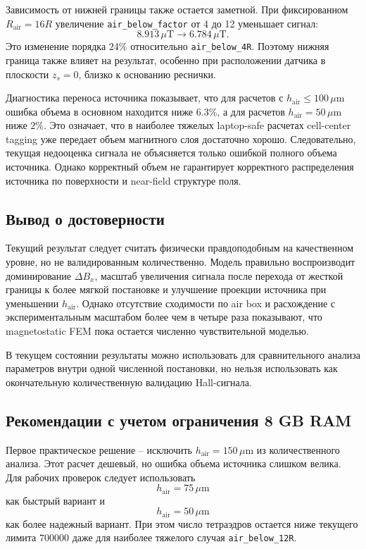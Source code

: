 \documentclass[12pt,a4paper]{article}
\begin{document}
Зависимость от нижней границы также остается заметной. При фиксированном
\(R_{\mathrm{air}}=16R\) увеличение \texttt{air\_below\_factor} от 4 до 12
уменьшает сигнал:
\[
    8.913\,\mu\mathrm{T}
    \rightarrow
    6.784\,\mu\mathrm{T}.
\]
Это изменение порядка \(24\%\) относительно \texttt{air\_below\_4R}. Поэтому
нижняя граница также влияет на результат, особенно при расположении датчика в
плоскости \(z_s=0\), близко к основанию реснички.

Диагностика переноса источника показывает, что для расчетов с
\(h_{\mathrm{air}}\le 100\,\mu\mathrm{m}\) ошибка объема в основном находится
ниже \(6.3\%\), а для расчетов \(h_{\mathrm{air}}=50\,\mu\mathrm{m}\) ниже
\(2\%\). Это означает, что в наиболее тяжелых laptop-safe расчетах
cell-center tagging уже передает объем магнитного слоя достаточно хорошо.
Следовательно, текущая недооценка сигнала не объясняется только ошибкой полного
объема источника. Однако корректный объем не гарантирует корректного
распределения источника по поверхности и near-field структуре поля.

\subsection*{Вывод о достоверности}

Текущий результат следует считать физически правдоподобным на качественном
уровне, но не валидированным количественно. Модель правильно воспроизводит
доминирование \(\Delta B_x\), масштаб увеличения сигнала после перехода от
жесткой границы к более мягкой постановке и улучшение проекции источника при
уменьшении \(h_{\mathrm{air}}\). Однако отсутствие сходимости по air box и
расхождение с экспериментальным масштабом более чем в четыре раза показывают,
что magnetostatic FEM пока остается численно чувствительной моделью.

В текущем состоянии результаты можно использовать для сравнительного анализа
параметров внутри одной численной постановки, но нельзя использовать как
окончательную количественную валидацию Hall-сигнала.

\subsection*{Рекомендации с учетом ограничения 8 GB RAM}

Первое практическое решение -- исключить \(h_{\mathrm{air}}=150\,\mu\mathrm{m}\)
из количественного анализа. Этот расчет дешевый, но ошибка объема источника
слишком велика. Для рабочих проверок следует использовать
\[
    h_{\mathrm{air}} = 75\,\mu\mathrm{m}
\]
как быстрый вариант и
\[
    h_{\mathrm{air}} = 50\,\mu\mathrm{m}
\]
как более надежный вариант. При этом число тетраэдров остается ниже текущего
лимита \(700000\) даже для наиболее тяжелого случая \texttt{air\_below\_12R}.
\end{document}
